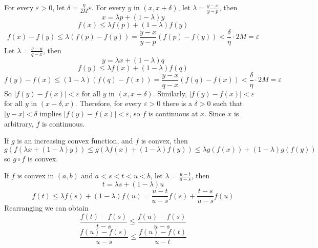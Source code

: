 \documentclass[a4paper]{article}
\begin{document}
For every $\varepsilon>0$, let $\delta=\frac{\eta}{2M}\varepsilon$. For every $y$ in $(x,x+\delta)$, let $\lambda=\frac{y-x}{y-p}$, then
\[
x=\lambda p+(1-\lambda)y
\]
\[
f(x)\leq \lambda f(p)+(1-\lambda)f(y)
\]
\[
f(x)-f(y)\leq\lambda\left(f(p)-f(y) \right)=\frac{y-x}{y-p}\left(f(p)-f(y) \right)<\frac{\delta}{\eta}\cdot 2M=\varepsilon
\]
Let $\lambda=\frac{q-y}{q-x}$, then
\[
y=\lambda x+(1-\lambda)q
\]
\[
f(y)\leq \lambda f(x)+(1-\lambda)f(q)
\]
\[
f(y)-f(x)\leq(1-\lambda)(f(q)-f(x))=\frac{y-x}{q-x}(f(q)-f(x))<\frac{\delta}{\eta}\cdot 2M=\varepsilon
\]
So $|f(y)-f(x)|<\varepsilon$ for all $y$ in $(x,x+\delta)$. Similarly, $|f(y)-f(x)|<\varepsilon$ for all $y$ in $(x-\delta,x)$. Therefore, for every $\varepsilon>0$ there is a $\delta>0$ such that $|y-x|<\delta$ implies $|f(y)-f(x)|<\varepsilon$, so $f$ is continuous at $x$. Since $x$ is arbitrary, $f$ is continuous.

If $g$ is an increasing convex function, and $f$ is convex, then
\[
g(f(\lambda x+(1-\lambda)y))\leq g(\lambda f(x)+(1-\lambda)f(y))\leq \lambda g(f(x))+(1-\lambda)g(f(y))
\]
so $g\circ f$ is convex.

If $f$ is convex in $(a,b)$ and $a<s<t<u<b$, let $\lambda=\frac{u-t}{u-s}$, then
\[
t=\lambda s+(1-\lambda)u
\]
\[
f(t)\leq \lambda f(s)+(1-\lambda)f(u)=\frac{u-t}{u-s}f(s)+\frac{t-s}{u-s}f(u)
\]
Rearranging we can obtain
\[
\frac{f(t)-f(s)}{t-s}\leq\frac{f(u)-f(s)}{u-s}
\]
\[
\frac{f(u)-f(s)}{u-s}\leq\frac{f(u)-f(t)}{u-t}
\]
\end{document}
